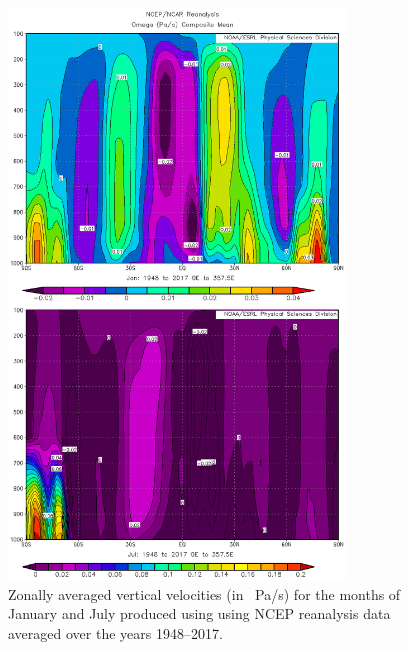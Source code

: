 \documentclass[11pt]{article}
\begin{document}
\begin{figure}[h!]
  \centering
  \includegraphics[width=0.8\textwidth]{omega_janjul.png}
  \caption{Zonally averaged vertical velocities (in \SI{}{\Pa/\s}) for the months of January and July produced using using NCEP reanalysis data averaged over the years 1948--2017.}
  \label{fig:omega}
\end{figure}


%
\end{document}
